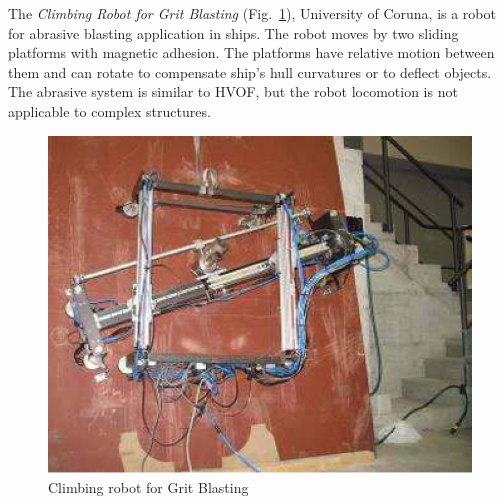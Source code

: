 The \textit{Climbing Robot for Grit Blasting} (Fig.~\ref{grit}), %
University of Coruna, is a robot for abrasive blasting application in ships. The
robot moves by two sliding platforms with magnetic adhesion. The platforms have relative motion
between them and can rotate to compensate ship's hull curvatures or to
deflect objects. The abrasive system is similar to HVOF, but the robot
locomotion is not applicable to complex structures.


\begin{figure}[ht]
	\centering
	\includegraphics[scale=0.3]{figs/climbers/grit.png}
	\caption{Climbing robot for Grit Blasting}
	\label{grit}
\end{figure}


